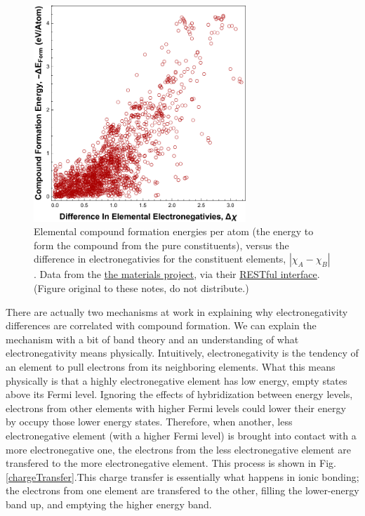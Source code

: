 \documentclass[12pt]{article}
\begin{document}
\begin{figure}[h]
\centering
\includegraphics[width=8cm]{electronegativityDifCorrelation}
\caption{
	Elemental compound formation energies per atom (the energy to form the compound from the pure constituents), versus the difference in electronegativies for the constituent elements, $|\chi_A - \chi_B|$. Data from the \href{https://www.materialsproject.org/}{the materials project}, via their \href{http://dx.doi.org/10.1016/j.commatsci.2014.05.014}{RESTful interface}. (Figure original to these notes, do not distribute.)
}
\label{electronegativityCorrelation}
\end{figure}

There are actually two mechanisms at work in explaining why electronegativity differences are correlated with compound formation. We can explain the mechanism with a bit of band theory and an understanding of what electronegativity means physically. Intuitively, electronegativity is the tendency of an element to pull electrons from its neighboring elements. What this means physically is that a highly electronegative element has low energy, empty states above its Fermi level. Ignoring the effects of hybridization between energy levels, electrons from other elements with higher Fermi levels could lower their energy by occupy those lower energy states. Therefore, when another, less electronegative element (with a higher Fermi level) is brought into contact with a more electronegative one, the electrons from the less electronegative element are transfered to the more electronegative element. This process is shown in Fig. \ref{chargeTransfer}.This charge transfer is essentially what happens in ionic bonding; the electrons from one element are transfered to the other, filling the lower-energy band up, and emptying the higher energy band.
\end{document}
